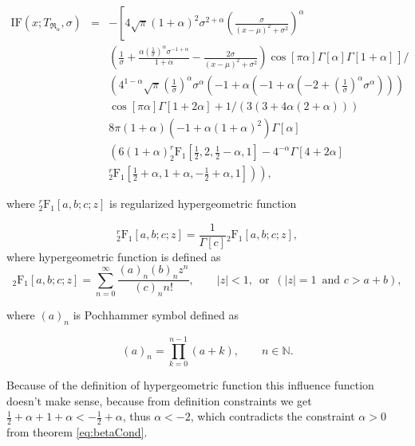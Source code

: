 \begin{eqnarray}
\mathrm{IF}(x;T_{\mathfrak{R}_\alpha},\sigma) &=& -\left[4 \sqrt{\pi } (1+\alpha )^2 \sigma ^{2+\alpha } \left(\frac{\sigma }{(x-\mu )^2+\sigma ^2}\right)^{\alpha} \right. \nonumber\\
&&\left(\frac{1}{\sigma }+\frac{\alpha  \left(\frac{1}{\sigma }\right)^{\alpha } \sigma ^{-1+\alpha }}{1+\alpha }-\frac{2 \sigma }{(x-\mu )^2+\sigma ^2}\right) \left. \cos[\pi  \alpha ] \Gamma[\alpha ] \Gamma[1+\alpha ]  \frac{}{} \right] / \nonumber \\ %
&&\left(4^{1-\alpha } \sqrt{\pi } \left(\frac{1}{\sigma }\right)^{\alpha } \sigma ^{\alpha } \left(-1+\alpha  \left(-1+\alpha  \left(-2+\left(\frac{1}{\sigma }\right)^{\alpha } \sigma ^{\alpha }\right)\right)\right) \right.\nonumber \\ 
&&\left. \cos[\pi  \alpha ] \Gamma[1+2 \alpha ]+1/(3 (3+4 \alpha  (2+\alpha )))\right. \nonumber \\
&& 8 \pi  (1+\alpha ) \left(-1+\alpha  (1+\alpha )^2\right) \Gamma[\alpha ] \nonumber \\
&& \left(6 (1+\alpha ) ^r_2\mathrm{F}_1\left[\frac{1}{2},2,\frac{1}{2}-\alpha ,1\right]-4^{-\alpha } \Gamma[4+2 \alpha ] \right. \nonumber \\
&& \left. \left. ^r_2\mathrm{F}_1\left[\frac{1}{2}+\alpha ,1+\alpha ,-\frac{1}{2}+\alpha ,1\right]\right)\right),
\end{eqnarray}

\noindent where $^r_2\mathrm{F}_1[a,b;c;z]$ is regularized hypergeometric function

\begin{equation}
	^r_2\mathrm{F}_1[a,b;c;z] = {\frac{1}{\Gamma[c]}} {_2\mathrm{F}_1}[a,b;c;z],
\end{equation}
where hypergeometric function is defined as
\begin{equation}
	{_2\mathrm{F}_1}[a,b;c;z]=\sum _{n=0}^{\infty } \frac{(a)_n (b)_n z^n}{ (c)_n n!}, \qquad |z|<1, \, \text{ or } \, (|z|=1  \, \text{ and} \,\,  c>a+b),
\end{equation}

\noindent where $(a)_n$ is Pochhammer symbol defined as

\begin{equation}
(a)_n=\prod _{k=0}^{n-1} (a+k), \qquad n \in \mathbb{N}.
\end{equation}

\noindent Because of the definition of hypergeometric function this influence function doesn't make sense, because from definition constraints we get $\frac{1}{2}+\alpha  + 1+\alpha < -\frac{1}{2}+\alpha $, thus  $\alpha < -2$, which contradicts the constraint  $\alpha>0$ from theorem \ref{eq:betaCond}. 

